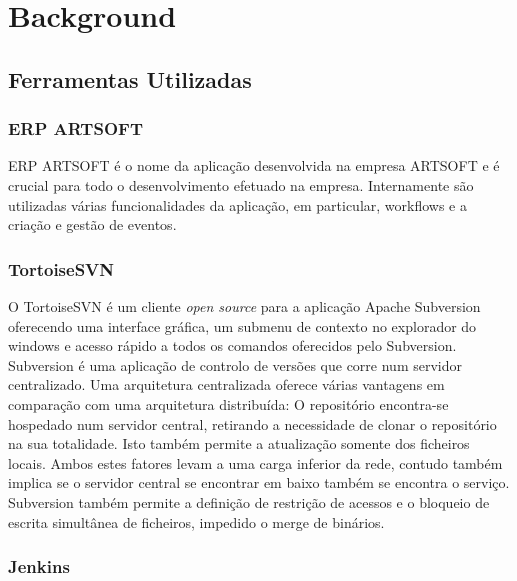 \documentclass[sigplan]{acmart}
\begin{document}
\section{Background} \label{sec:background}

\subsection{Ferramentas Utilizadas}

\subsubsection{ERP ARTSOFT}

ERP ARTSOFT é o nome da aplicação desenvolvida na empresa ARTSOFT e é crucial para todo o desenvolvimento efetuado na empresa. Internamente são utilizadas várias funcionalidades da aplicação, em particular, workflows e a criação e gestão de eventos. 

\subsubsection{TortoiseSVN}

O TortoiseSVN é um cliente \textit{open source} para a aplicação Apache Subversion oferecendo uma interface gráfica, um submenu de contexto no explorador do windows e acesso rápido a todos os comandos oferecidos pelo Subversion. Subversion é uma aplicação de controlo de versões que corre num servidor centralizado. Uma arquitetura centralizada oferece várias vantagens em comparação com uma arquitetura distribuída: O repositório encontra-se hospedado num servidor central, retirando a necessidade de clonar o repositório na sua totalidade. Isto também permite a atualização somente dos ficheiros locais. Ambos estes fatores levam a uma carga inferior da rede, contudo também implica se o servidor central se encontrar em baixo também se encontra o serviço. Subversion também permite a definição de restrição de acessos e o bloqueio de escrita simultânea de ficheiros, impedido o merge de binários.

\subsubsection{Jenkins}
\end{document}

